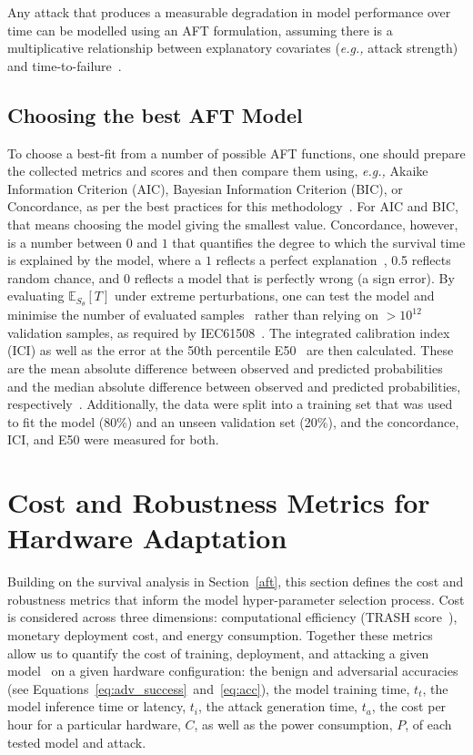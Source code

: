 \documentclass[conference]{IEEEtran}%
\begin{document}
Any attack that produces a measurable degradation in model performance over time can be modelled using an AFT formulation, assuming there is a multiplicative relationship between explanatory covariates (\textit{e.g.,} attack strength) and time-to-failure~\cite{meyers_aft,aft_models,kleinbaum1996survival}.

\subsection{Choosing the best AFT Model}
\label{best-fit}
To choose a best-fit from a number of possible AFT functions, one should prepare the collected metrics and scores and then compare them using, \textit{e.g.,} Akaike Information Criterion (AIC), Bayesian Information Criterion (BIC), or Concordance, as per the best practices for this methodology~\cite{aft_models,kleinbaum1996survival}.
For AIC and BIC, that means choosing the model giving the smallest value. 
Concordance, however, is a number between $0$ and $1$ that quantifies the degree to which the survival time is explained by the model, where a $1$ reflects a perfect explanation~\cite{kleinbaum1996survival}, 0.5 reflects random chance, and 0 reflects a model that is perfectly wrong (a sign error). 
By evaluating $\mathbb{E}_{S_\theta}[T]$ under extreme perturbations, one can test the model and minimise the number of evaluated samples~\cite{aft_models,kleinbaum1996survival} rather than relying on $> 10^{12}$ validation samples, as required by IEC61508~\cite{IEC61508}.
The integrated calibration index (ICI) as well as the error at the 50th percentile E50~\cite{ici} are then calculated. 
These are the mean absolute difference between observed and predicted probabilities and the median absolute difference between observed and predicted probabilities, respectively~\cite{ici}.
Additionally, the data were split into a training set that was used to fit the model (80\%) and an unseen validation set (20\%), and the concordance, ICI, and E50 were measured for both.


\section{Cost and Robustness Metrics for Hardware Adaptation}
\label{cost}

Building on the survival analysis in Section~\ref{aft}, this section defines the cost and robustness metrics that inform the model hyper-parameter selection process. 
Cost is considered across three dimensions: computational efficiency (TRASH score~\cite{meyers_aft}), monetary deployment cost, and energy consumption. 
Together these metrics allow us to quantify the cost of training, deployment, and attacking a given model~\cite{IEC61508} on a given hardware configuration: the benign and adversarial accuracies (see Equations~\ref{eq:adv_success}~and~\ref{eq:acc}), the model training time, $t_{t}$, the model inference time or latency, $t_{i}$, the attack generation time, $t_{a}$, the cost per hour for a particular hardware, $C$, as well as the power consumption, $P$, of each tested model and attack.
\end{document}
